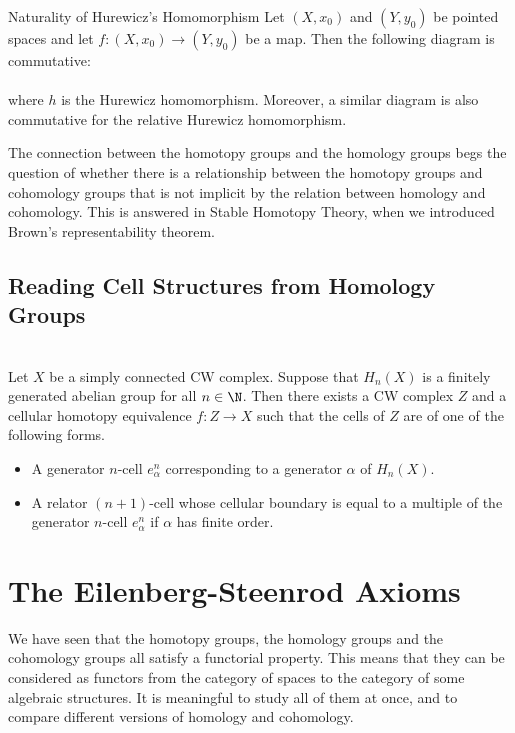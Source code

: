 \documentclass[a4paper]{article}
\begin{document}
\begin{thm}{Naturality of Hurewicz's Homomorphism}{} Let $(X,x_0)$ and $(Y,y_0)$ be pointed spaces and let $f:(X,x_0)\to(Y,y_0)$ be a map. Then the following diagram is commutative: \\
\\
where $h$ is the Hurewicz homomorphism. Moreover, a similar diagram is also commutative for the relative Hurewicz homomorphism. 
\end{thm}

The connection between the homotopy groups and the homology groups begs the question of whether there is a relationship between the homotopy groups and cohomology groups that is not implicit by the relation between homology and cohomology. This is answered in Stable Homotopy Theory, when we introduced Brown's representability theorem. 

\subsection{Reading Cell Structures from Homology Groups}
\begin{prp}{}{}\\
Let $X$ be a simply connected CW complex. Suppose that $H_n(X)$ is a finitely generated abelian group for all $n\in\N$. Then there exists a CW complex $Z$ and a cellular homotopy equivalence $f:Z\to X$ such that the cells of $Z$ are of one of the following forms. 
\begin{itemize}
\item A generator $n$-cell $e_\alpha^n$ corresponding to a generator $\alpha$ of $H_n(X)$. 
\item A relator $(n+1)$-cell whose cellular boundary is equal to a multiple of the generator $n$-cell $e_\alpha^n$ if $\alpha$ has finite order. 
\end{itemize}
\end{prp}

\pagebreak
\section{The Eilenberg-Steenrod Axioms}
We have seen that the homotopy groups, the homology groups and the cohomology groups all satisfy a functorial property. This means that they can be considered as functors from the category of spaces to the category of some algebraic structures. It is meaningful to study all of them at once, and to compare different versions of homology and cohomology. \\
\end{document}
